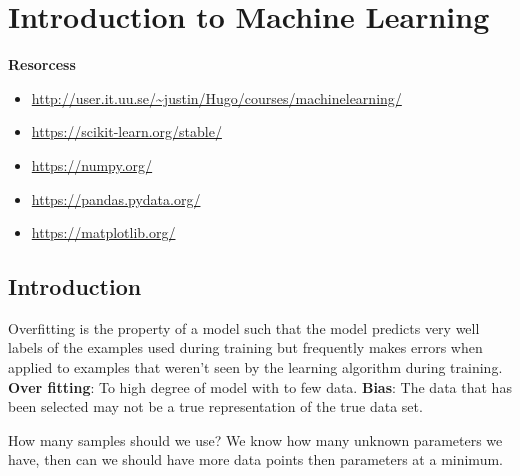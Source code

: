 \chapter{Introduction to Machine Learning}

\textbf{Resorcess}
\begin{itemize}
    \item \url{http://user.it.uu.se/~justin/Hugo/courses/machinelearning/}
    \item \url{https://scikit-learn.org/stable/}
    \item \url{https://numpy.org/}
    \item \url{https://pandas.pydata.org/}
    \item \url{https://matplotlib.org/}
\end{itemize}

\newpage

\section{Introduction}
Overfitting is the property of a model such that the model
predicts very well labels of the examples used during training but frequently makes errors
when applied to examples that weren’t seen by the learning algorithm during training.
\textbf{Over fitting}: To high degree of model with to few data.
\textbf{Bias}: The data that has been selected may not be a true representation of 
the true data set. 

How many samples should we use? We know how many unknown parameters we have, then 
can we should have more data points then parameters at a minimum.

